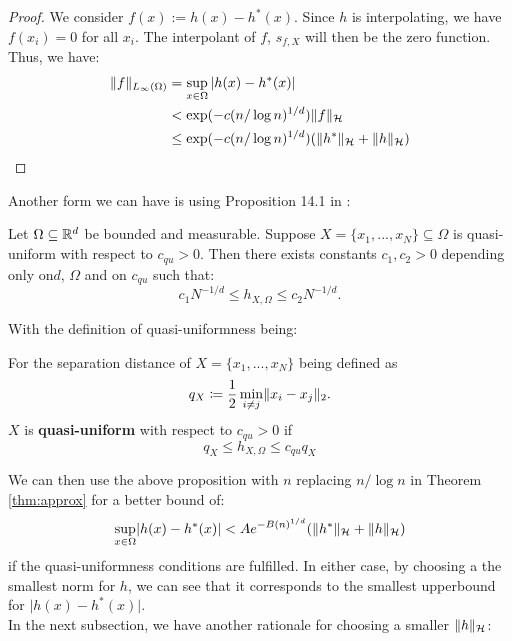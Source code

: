 \documentclass[twoside]{memoir}
\begin{document}
\begin{proof}
	We consider $f(x) := h(x) - h^*(x)$. Since $h$ is interpolating, we have $f(x_i) = 0$ for all $x_i$. The interpolant of $f$, $s_{f,X}$ will then be the zero function. Thus, we have:
	\begin{equation*}
	\begin{split}
	\lVert f\rVert_{L_\infty(\Omega)} &= \sup_{x \in \Omega} \vert h(x) - h^*(x)\vert \\
	&< \exp(-c(n/\log n)^{1/d})\lVert f\rVert_{\mathcal{H}} \\
	&\leq \exp(-c(n/\log n)^{1/d}) (\lVert h^*\rVert_{\mathcal{H}} + \lVert h\rVert_{\mathcal{H}})
	\end{split}
	\end{equation*}
\end{proof}
Another form we can have is using Proposition 14.1 in \cite{ScatteredDataApproximation}:
\begin{prop}
	Let $\Omega \subseteq \mathbb{R}^d$ be bounded and measurable. Suppose $X = \{x_1, ... , x_N\} \subseteq \Omega$ is quasi-uniform with respect to  $c_{qu} > 0$. Then there exists constants $c_1, c_2 > 0$ depending only on$d$, $\Omega$ and on $c_{qu}$ such that:
	\[c_1N^{-1/d} \leq h_{X,\Omega} \leq c_2N^{-1/d}. \]
\end{prop}
With the definition of quasi-uniformness being:
\begin{defn}
	For the separation distance of $X = \{x_1, ... , x_N\}$ being defined as \[q_X \coloneqq \frac{1}{2} \min_{i\neq j} \lVert x_i - x_j\rVert_2. \] $X$ is \textbf{quasi-uniform} with respect to $c_{qu} > 0$ if
	\[ q_X \leq h_{X,\Omega} \leq c_{qu}q_X \]
\end{defn}
We can then use the above proposition with $n$ replacing $n/\log n$ in Theorem \ref{thm:approx} for a better bound of:
\[ \sup_{x \in \Omega} \lvert h(x) - h^*(x)\rvert < A e^{-B(n)^{1/d}} (\lVert h^*\rVert_{\mathcal{H}} + \lVert h\rVert_{\mathcal{H}}) \]
if the quasi-uniformness conditions are fulfilled.
In either case, by choosing a the smallest norm for $h$, we can see that it corresponds to the smallest upperbound for $\vert h(x) - h^*(x)\vert$. \\
In the next subsection, we have another rationale for choosing a smaller $\lVert h\rVert_{\mathcal{H}}$:
\end{document}

